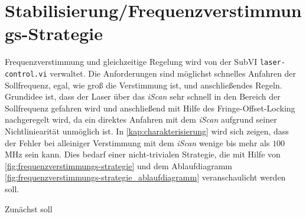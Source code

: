 \section{Stabilisierung/Frequenzverstimmungs-Strategie}\label{sec:stabilisierung_frequenzverstimmungs-strategie}
Frequenzverstimmung und gleichzeitige Regelung wird von der SubVI
\lstinline|laser-control.vi| verwaltet. Die Anforderungen sind möglichst
schnelles Anfahren der Sollfrequenz, egal, wie groß die Verstimmung ist, und
anschließendes Regeln. Grundidee ist, dass der Laser über das \textit{iScan}
sehr schnell in den Bereich der Sollfrequenz gefahren wird und anschließend mit Hilfe
des Fringe-Offset-Locking nachgeregelt wird, da ein direktes Anfahren mit dem
\textit{iScan} aufgrund seiner Nichtliniearität unmöglich ist. In
\ref{kap:charakterisierung} wird sich zeigen, dass der Fehler bei alleiniger
Verstimmung mit dem \textit{iScan} wenige bis mehr als $100\,$MHz sein kann.
Dies bedarf einer nicht-trivialen Strategie, die mit Hilfe von
\ref{fig:frequenzverstimmungs-strategie} und dem Ablaufdiagramm
\ref{fig:frequenzverstimmungs-strategie_ablaufdiagramm} veranschaulicht werden
soll.\par
Zunächst soll
